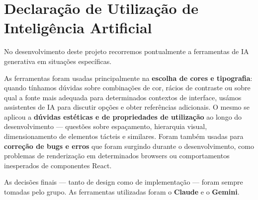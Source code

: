 \chapter{Declaração de Utilização de Inteligência Artificial}
\label{chap:ai-disclaimer}

No desenvolvimento deste projeto recorremos pontualmente a ferramentas de \ac{IA} generativa em situações específicas.

As ferramentas foram usadas principalmente na \textbf{escolha de cores e tipografia}: quando tínhamos dúvidas sobre combinações de cor, rácios de contraste ou sobre qual a fonte mais adequada para determinados contextos de interface, usámos assistentes de \ac{IA} para discutir opções e obter referências adicionais. O mesmo se aplicou a \textbf{dúvidas estéticas e de propriedades de utilização} ao longo do desenvolvimento --- questões sobre espaçamento, hierarquia visual, dimensionamento de elementos tácteis e similares. Foram também usadas para \textbf{correção de bugs e erros} que foram surgindo durante o desenvolvimento, como problemas de renderização em determinados browsers ou comportamentos inesperados de componentes React.

As decisões finais --- tanto de design como de implementação --- foram sempre tomadas pelo grupo. 
As ferramentas utilizadas foram o \textbf{Claude} e o \textbf{Gemini}.
